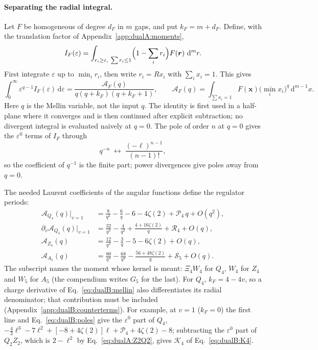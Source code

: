 \documentclass[11pt,a4paper]{article}
\numberwithin{equation}{section}
\newcommand{\dd}{\,\mathrm d}
\begin{document}
\paragraph{Separating the radial integral.} Let $F$ be homogeneous of degree $d_F$ in $m$ gaps, and put $k_F=m+d_F$.
Define, with the translation factor of Appendix~\ref{app:dualA:moments},
\begin{equation}
 I_F(\varepsilon)=\int_{r_i\ge\varepsilon,\ \sum r_i\le1}\Bigl(1-\sum_ir_i\Bigr)F(\boldsymbol r)\,\dd^mr.
\end{equation}
First integrate $\varepsilon$ up to $\min_ir_i$, then write $r_i=Rx_i$ with $\sum_ix_i=1$. This gives
\begin{equation}
 \int_0^\infty\varepsilon^{q-1}I_F(\varepsilon)\dd\varepsilon=\frac{\mathcal A_F(q)}{q(q+k_F)(q+k_F+1)},\qquad
 \mathcal A_F(q)=\int_{\sum x_i=1}F(\boldsymbol x)\bigl(\min_ix_i\bigr)^q\dd^{m-1}x.
 \label{eq:dualB:mellin}
\end{equation}
Here $q$ is the Mellin variable, not the input $q$. The identity is first used in a half-plane where it converges and
is then continued after explicit subtraction; no divergent integral is evaluated naively at $q=0$. The pole of order
$n$ at $q=0$ gives the $\varepsilon^0$ terms of $I_F$ through
\begin{equation}
 q^{-n}\;\longleftrightarrow\;\frac{(-\ell)^{n-1}}{(n-1)!},
 \label{eq:dualB:poles}
\end{equation}
so the coefficient of $q^{-1}$ is the finite part; power divergences give poles away from $q=0$.

The needed Laurent coefficients of the angular functions define the regulator periods:
\begin{equation}
\begin{aligned}
 \mathcal A_{Q_4}(q)\big|_{v=1}&=\frac8{q^2}-\frac6q-6-4\zeta(2)+\mathcal P_4\,q+O(q^2),\\
 \partial_v\mathcal A_{Q_4}(q)\big|_{v=1}&=\frac{32}{q^3}-\frac4{q^2}+\frac{4+16\zeta(2)}{q}+\mathcal R_4+O(q),\\
 \mathcal A_{Z_4}(q)&=\frac{12}{q^2}-\frac3q-5-6\zeta(2)+O(q),\\
 \mathcal A_{A_5}(q)&=\frac{80}{q^3}-\frac{68}{q^2}-\frac{56+48\zeta(2)}{q}+\mathcal S_5+O(q).
\end{aligned}
\label{eq:dualB:laurent}
\end{equation}
The subscript names the moment whose kernel is meant: $\Xi_4W_4$ for $Q_4$, $W_4$ for $Z_4$ and $W_5$ for $A_5$ (the
compendium writes $G_5$ for the last). For $Q_4$, $k_F=4-4v$, so a charge derivative of Eq.~\eqref{eq:dualB:mellin}
also differentiates its radial denominator; that contribution must be included
(Appendix~\ref{app:dualB:counterterms}). For example, at $v=1$ ($k_F=0$) the first line and
Eq.~\eqref{eq:dualB:poles} give the $\varepsilon^0$ part of $Q_4$,
$-\frac43\ell^3-7\ell^2+[-8+4\zeta(2)]\ell+\mathcal P_4+4\zeta(2)-8$; subtracting the $\varepsilon^0$ part of $Q_2Z_2$,
which is $2-\ell^2$ by Eq.~\eqref{eq:dualA:Z2Q2}, gives $\mathcal K_4$ of Eq.~\eqref{eq:dualB:K4}.
\end{document}
